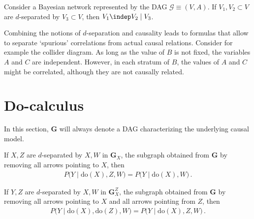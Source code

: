    \begin{property}
        Consider a Bayesian network represented by the DAG $\mathcal{G}\equiv(V,A)$. If $V_1,V_2\subset V$ are $d$-separated by $V_3\subset V$, then $V_1\indep V_2\mid V_3$.
    \end{property}


    Combining the notions of $d$-separation and causality leads to formulas that allow to separate `spurious' correlations from actual causal relations. Consider for example the collider diagram. As long as the value of $B$ is not fixed, the variables $A$ and $C$ are independent. However, in each stratum of $B$, the values of $A$ and $C$ might be correlated, although they are not causally related.

\section{Do-calculus}

    In this section, $\mathbf{G}$ will always denote a DAG characterizing the underlying causal model.

    \begin{axiom}
        If $X,Z$ are $d$-separated by $X,W$ in $\mathbf{G}_X$, the subgraph obtained from $\mathbf{G}$ by removing all arrows pointing to $X$, then
        \begin{gather}
            P\bigl(Y\mid\mathrm{do}(X),Z,W\bigr) = P\bigl(Y\mid\mathrm{do}(X),W\bigr)\,.
        \end{gather}
    \end{axiom}

    \begin{axiom}
        If $Y,Z$ are $d$-separated by $X,W$ in $\mathbf{G}_X^Z$, the subgraph obtained from $\mathbf{G}$ by removing all arrows pointing to $X$ and all arrows pointing from $Z$, then
        \begin{gather}
            P\bigl(Y\mid\mathrm{do}(X),\mathrm{do}(Z),W\bigr) = P\bigl(Y\mid\mathrm{do}(X),Z,W\bigr)\,.
        \end{gather}
    \end{axiom}

